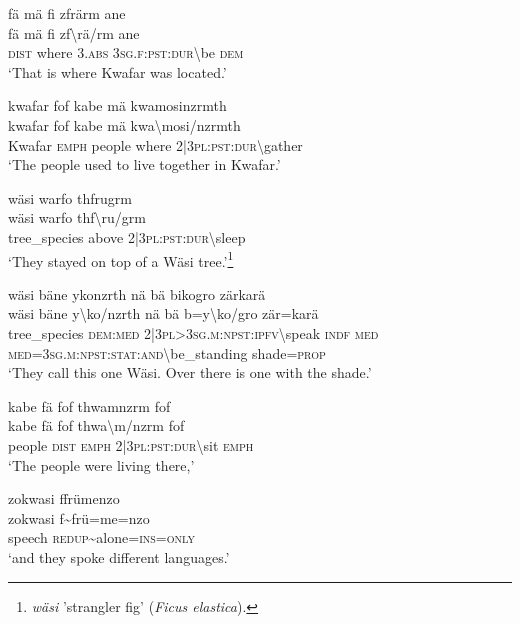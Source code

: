 \ea\label{ex:1:a3495}
fä mä fi zfrärm ane\\
\gll fä	mä	fi	zf{\textbackslash}rä/rm	ane\\
     \textsc{dist}	where	3.\textsc{abs}	3\textsc{sg}.\textsc{f}:\textsc{pst}:\textsc{dur}{\textbackslash}be	\textsc{dem}\\
\glt `That is where Kwafar was located.'
\z

\ea\label{ex:1:a3496}
kwafar fof kabe mä kwamosinzrmth\\
\gll kwafar	fof	kabe	mä	kwa{\textbackslash}mosi/nzrmth\\
     Kwafar	\textsc{emph}	people	where	2|3\textsc{pl}:\textsc{pst}:\textsc{dur}{\textbackslash}gather\\
\glt `The people used to live together in Kwafar.'
\z

\ea\label{ex:1:a3497}
wäsi warfo thfrugrm\\
\gll wäsi	warfo	thf{\textbackslash}ru/grm\\
     tree\_species	above	2|3\textsc{pl}:\textsc{pst}:\textsc{dur}{\textbackslash}sleep\\
\glt `They stayed on top of a Wäsi tree.'\footnote{\textit{wäsi} 'strangler fig' (\textit{Ficus elastica}).}
\z

\newpage
\ea\label{ex:1:a3498}
wäsi bäne ykonzrth nä bä bikogro zärkarä\\
\gll wäsi	bäne	y{\textbackslash}ko/nzrth	nä	bä	b=y{\textbackslash}ko/gro	zär=karä\\
     tree\_species	\textsc{dem}:\textsc{med}	2|3\textsc{pl}>3\textsc{sg}.\textsc{m}:\textsc{npst}:\textsc{ipfv}{\textbackslash}speak	\textsc{indf}	\textsc{med}	\textsc{med}=3\textsc{sg}.\textsc{m}:\textsc{npst}:\textsc{stat}:\textsc{and}{\textbackslash}be\_standing	shade=\textsc{prop}\\
\glt `They call this one Wäsi. Over there is one with the shade.'
\z

\ea\label{ex:1:a3500}
kabe fä fof thwamnzrm fof\\
\gll kabe	fä	fof	thwa{\textbackslash}m/nzrm	fof\\
     people	\textsc{dist}	\textsc{emph}	2|3\textsc{pl}:\textsc{pst}:\textsc{dur}{\textbackslash}sit	\textsc{emph}\\
\glt `The people were living there,'
\z

\ea\label{ex:1:a3501}
zokwasi ffrümenzo\\
\gll zokwasi	f{\textasciitilde}frü=me=nzo\\
     speech	\textsc{redup}{\textasciitilde}alone=\textsc{ins}=\textsc{only}\\
\glt `and they spoke different languages.'
\z

